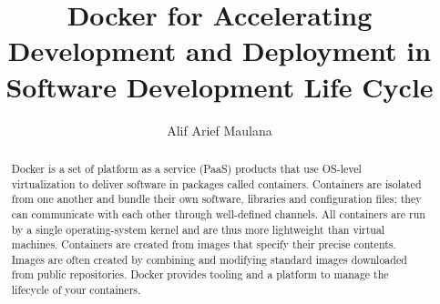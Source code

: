 \documentclass[10pt, a4paper]{article}
\begin{document}
\title{\textbf{Docker for Accelerating Development and Deployment in Software Development Life Cycle}}
\author{Alif Arief Maulana}

\maketitle

\begin{abstract}
Docker is a set of platform as a service (PaaS) products that use OS-level virtualization to deliver software in packages called containers. Containers are isolated from one another and bundle their own software, libraries and configuration files; they can communicate with each other through well-defined channels. All containers are run by a single operating-system kernel and are thus more lightweight than virtual machines. Containers are created from images that specify their precise contents. Images are often created by combining and modifying standard images downloaded from public repositories. Docker provides tooling and a platform to manage the lifecycle of your containers.
\end{abstract}









\printbibliography
\end{document}
